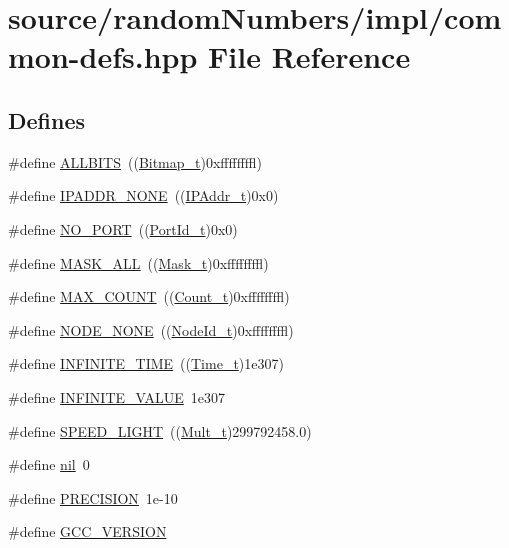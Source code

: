 \hypertarget{common-defs_8hpp}{
\section{source/randomNumbers/impl/common-defs.hpp File Reference}
\label{common-defs_8hpp}
}
\subsection*{Defines}
\begin{CompactItemize}
\item 
\#define \hyperlink{common-defs_8hpp_eef12456483291005b5a0a8e8d2c1256}{ALLBITS}~((\hyperlink{common-defs_8hpp_e7a428d359769031670ad716f9182c17}{Bitmap\_\-t})0xffffffffl)
\item 
\#define \hyperlink{common-defs_8hpp_bc4b2e3531c4992f2ae4b8c0f9751544}{IPADDR\_\-NONE}~((\hyperlink{common-defs_8hpp_780b971097907a80d4d34b4a32eceed8}{IPAddr\_\-t})0x0)
\item 
\#define \hyperlink{common-defs_8hpp_97d79bc575f6aa07f65b65c3d64dbd9a}{NO\_\-PORT}~((\hyperlink{common-defs_8hpp_86c518e080cd022223ea3a6b521f6d5d}{PortId\_\-t})0x0)
\item 
\#define \hyperlink{common-defs_8hpp_1d4b2f1f2500bf78dd35c3be18693241}{MASK\_\-ALL}~((\hyperlink{common-defs_8hpp_af75856d762bf510c1154d2a7c3513f0}{Mask\_\-t})0xffffffffl)
\item 
\#define \hyperlink{common-defs_8hpp_e14eaaed1fe7cdf491da54a714c426b3}{MAX\_\-COUNT}~((\hyperlink{common-defs_8hpp_bdd4d02aefa61ef2e943e2c6a09566c6}{Count\_\-t})0xffffffffl)
\item 
\#define \hyperlink{common-defs_8hpp_1b42e58f4612fce6b5ffe2617f35173f}{NODE\_\-NONE}~((\hyperlink{common-defs_8hpp_b5bc3678439fa7c82ce3d7d6c59fe456}{NodeId\_\-t})0xffffffffl)
\item 
\#define \hyperlink{common-defs_8hpp_d6d23821ba98486c430e44681e2cb4c2}{INFINITE\_\-TIME}~((\hyperlink{common-defs_8hpp_80b23eab88362163e2edd1a8b8238ef1}{Time\_\-t})1e307)
\item 
\#define \hyperlink{common-defs_8hpp_b815de57d686525ec9a18eb67bede3cf}{INFINITE\_\-VALUE}~1e307
\item 
\#define \hyperlink{common-defs_8hpp_4ad362d24482ad4f50118d6e5775a02b}{SPEED\_\-LIGHT}~((\hyperlink{common-defs_8hpp_aa50d474d62a11178d02ca3d8a2af82e}{Mult\_\-t})299792458.0)
\item 
\#define \hyperlink{common-defs_8hpp_7a7ca81d2a85873283b5ec82953b1b25}{nil}~0
\item 
\#define \hyperlink{common-defs_8hpp_9c7b069fee3c8184e14a7de8e5da2dc6}{PRECISION}~1e-10
\item 
\#define \hyperlink{common-defs_8hpp_dbba0f726fc66d7100916c683b7568ae}{GCC\_\-VERSION}
\end{CompactItemize}
